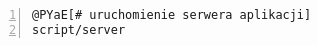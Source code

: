 \begin{Verbatim}[commandchars=@\[\],numbers=left,firstnumber=1,stepnumber=1]
@PYaE[# uruchomienie serwera aplikacji]
script/server
\end{Verbatim}
